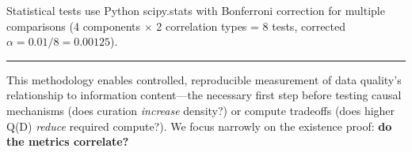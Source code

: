 Statistical tests use Python scipy.stats with Bonferroni correction for multiple comparisons (4 components $\times$ 2 correlation types = 8 tests, corrected $\alpha = 0.01/8 = 0.00125$).

\vspace{0.5em}
\noindent\rule{\textwidth}{0.4pt}
\vspace{0.5em}

This methodology enables controlled, reproducible measurement of data quality's relationship to information content---the necessary first step before testing causal mechanisms (does curation \textit{increase} density?) or compute tradeoffs (does higher Q(D) \textit{reduce} required compute?). We focus narrowly on the existence proof: \textbf{do the metrics correlate?}
